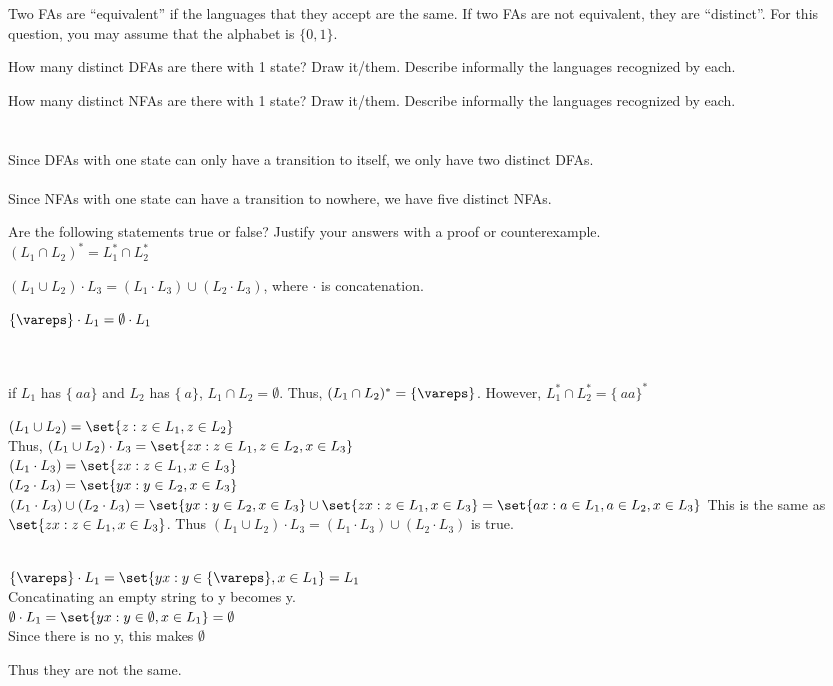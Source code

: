 \documentclass[solution, letterpaper]{cs121}
\begin{document}
\pagebreak

Two FAs are ``equivalent'' if the languages that they accept are the same. If two FAs are not equivalent, they are ``distinct''. For this question, you may assume that the alphabet is $\{0, 1\}$.

\subproblem How many distinct DFAs are there with 1 state? Draw it/them. Describe informally the languages recognized by each.

\subproblem How many distinct NFAs are there with 1 state? Draw it/them. Describe informally the languages recognized by each.
\\\\
\\\noindent Since DFAs with one state can only have a transition to itself, we only have two distinct DFAs. 
\\
\\\noindent Since NFAs with one state can have a transition to nowhere, we have five distinct NFAs. 

Are the following statements true or false? Justify your answers with a proof or counterexample.\\
\subproblem $(L_1 \cap L_2)^* = L_1^* \cap L_2^*$

\subproblem $(L_1 \cup L_2) \cdot L_3 = (L_1 \cdot L_3) \cup (L_2 \cdot L_3)$, where $\cdot$ is concatenation.

\subproblem $\{ \vareps\} \cdot L_1 = \emptyset \cdot L_1$
\\\\


\\ if $L_1$ has $\{\ aa \} $ and $L_2$ has $\{\ a \} $, $ L_1 \cap L_2 =\emptyset  $. Thus, $(L_1 \cap L_2)^* =\{\vareps \} $.
\noindent However, $L_1^* \cap L_2^* =\{\ aa \} ^*$


$(L_1 \cup L_2) = \set{z : z\in L_1 ,z\in L_2 }$
\\ Thus, $(L_1 \cup L_2) \cdot L_3 = \set{zx : z\in L_1 ,z\in L_2 ,x\in L_3 } $
\\$(L_1 \cdot L_3) =\set{zx : z\in L_1 ,x\in L_3 } $
\\$(L_2 \cdot L_3) =\set{yx : y\in L_2 ,x\in L_3 } $
\\$(L_1 \cdot L_3) \cup (L_2 \cdot L_3)=\set{yx : y\in L_2 ,x\in L_3 }  \cup \set{zx : z\in L_1 ,x\in L_3 } =\set{ax : a\in L_1 ,a\in L_2 ,x\in L_3 } $
This is the same as $\set{zx : z\in L_1 ,x\in L_3 } $.
Thus $(L_1 \cup L_2) \cdot L_3 = (L_1 \cdot L_3) \cup (L_2 \cdot L_3)$ is true.

\\ $\{ \vareps\} \cdot L_1 =\set{yx : y\in \{\vareps\} ,x\in L_1 } =L_1 $  
\\ Concatinating an empty string to y becomes y.
\\ $ \emptyset \cdot L_1 =\set{yx : y\in {\emptyset} ,x\in L_1 } =\emptyset $
\\ Since there is no y, this makes $\emptyset $

\noindent Thus they are not the same.
\end{document}
